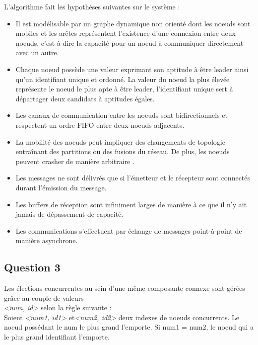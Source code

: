 \documentclass[paper=a4, fontsize=11pt]{article} %
\begin{document}
L'algorithme fait les hypothèses suivantes sur le système :
\begin{itemize}
\item Il est modélisable par un graphe dynamique non orienté dont les noeuds sont mobiles et les arêtes représentent l'existence d'une connexion entre deux noeuds, c'est-à-dire la capacité pour un noeud à communiquer directement avec un autre.

\item Chaque noeud possède une valeur exprimant son aptitude à être leader ainsi qu'un identifiant unique et ordonné. La valeur du noeud la plus élevée représente le noeud le plus apte à être leader, l'identifiant unique sert à départager deux candidats à aptitudes égales.

\item Les canaux de communication entre les noeuds sont bidirectionnels et respectent un ordre FIFO entre deux noeuds adjacents.

\item La mobilité des noeuds peut impliquer des changements de topologie entraînant des partitions ou des fusions du réseau. De plus, les noeuds peuvent crasher de manière arbitraire .

\item Les messages ne sont délivrés que si l'émetteur et le récepteur sont connectés durant l'émission du message.

\item Les buffers de réception sont infiniment larges de manière à ce que il n'y ait jamais de dépassement de capacité.

\item Les communications s'effectuent par échange de messages point-à-point de manière asynchrone.

\end{itemize}

\newpage
\subsection{Question 3}

Les élections concurrentes au sein d'une même composante connexe sont gérées grâce au couple de valeurs \\ \textit{<num, id>} selon la règle suivante :\\
Soient \textit{<num1, id1>} et\textit{<num2, id2>} deux indexes de noeuds concurrents. Le noeud possédant le num le plus grand l'emporte.
Si num1 = num2, le noeud qui a le plus grand identifiant l'emporte.
\end{document}
